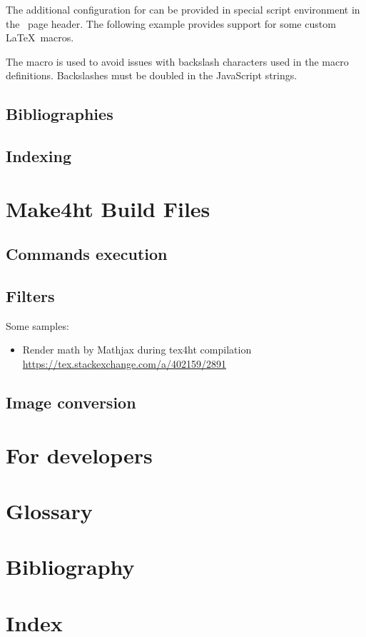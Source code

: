 \documentclass{book}
\begin{document}
The additional configuration for  can be provided in special
script environment in the \HTML\ page header. The following example provides
support for some custom \LaTeX\ macros.

\begin{texsource}
\end{texsource}

The \texcommand{\detokenize} macro is used to avoid issues with backslash
characters used in the macro definitions. Backslashes must be doubled in the
JavaScript strings.


\section{Bibliographies}
\section{Indexing}

\chapter{Make4ht Build Files}
\section{Commands execution}
\section{Filters}

Some samples:

\begin{itemize}
  \item Render math by Mathjax during tex4ht compilation \url{https://tex.stackexchange.com/a/402159/2891}
\end{itemize}
\section{Image conversion}

\chapter{For developers}


\chapter{Glossary}
\chapter{Bibliography}
\chapter{Index}
\end{document}
